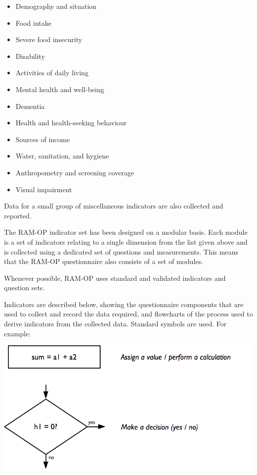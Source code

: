 \documentclass[12pt,a4paper]{book}
\providecommand{\tightlist}{%
  \setlength{\itemsep}{0pt}\setlength{\parskip}{0pt}}
\theoremstyle{definition}
\theoremstyle{definition}
\theoremstyle{definition}
\theoremstyle{remark}
\begin{document}
\begin{itemize}
\tightlist
\item
  Demography and situation
\item
  Food intake
\item
  Severe food insecurity
\item
  Disability
\item
  Activities of daily living
\item
  Mental health and well-being
\item
  Dementia
\item
  Health and health-seeking behaviour
\item
  Sources of income
\item
  Water, sanitation, and hygiene
\item
  Anthropometry and screening coverage
\item
  Visual impairment
\end{itemize}

Data for a small group of miscellaneous indicators are also collected
and reported.

The RAM-OP indicator set has been designed on a modular basis. Each
module is a set of indicators relating to a single dimension from the
list given above and is collected using a dedicated set of questions and
measurements. This means that the RAM-OP questionnaire also consists of
a set of modules.

Whenever possible, RAM-OP uses standard and validated indicators and
question sets.

Indicators are described below, showing the questionnaire components
that are used to collect and record the data required, and flowcharts of
the process used to derive indicators from the collected data. Standard
symbols are used. For example:

\begin{center}\includegraphics[width=9.76in]{figures/indicators01} \end{center}
\end{document}
